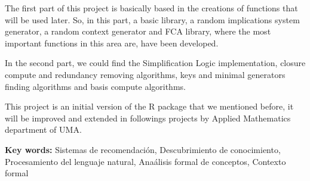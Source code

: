 {The first part of this project 
is basically based in the creations of functions that will be used later. So, in this part, a basic library, a random implications system 
generator, a random context generator and FCA library, where the most important functions in this area are, have been developed. 

In the 
second part, we could find the Simplification Logic implementation, closure compute and redundancy removing algorithms, keys and minimal 
generators finding algorithms and basis compute algorithms. 

This project is an initial version of the R package that we mentioned before, 
it will be improved and extended in followings projects by Applied Mathematics department of UMA.

\bigskip

\textbf{Key words:} Sistemas de recomendaci\'on, Descubrimiento de conocimiento, 
Procesamiento del lenguaje natural, Ana\'alisis formal de conceptos, 
Contexto formal

}
\newpage
\thispagestyle{empty}
\mbox{}
\newpage